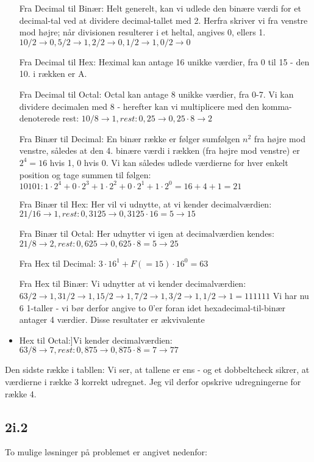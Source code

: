\begin{itemize}
\item[Fra Decimal til Binær:]{Helt generelt, kan vi udlede den binære værdi for et decimal-tal ved at dividere decimal-tallet med 2. Herfra skriver vi fra venstre mod højre; når divisionen resulterer i et heltal, angives 0, ellers 1. $10/2 \rightarrow 0, 5/2 \rightarrow 1, 2/2 \rightarrow 0, 1/2 \rightarrow 1, 0/2 \rightarrow 0$}
\item[Fra Decimal til Hex:]{Heximal kan antage 16 unikke værdier, fra 0 til 15 - den 10. i rækken er A.}
\item[Fra Decimal til Octal:]{Octal kan antage 8 unikke værdier, fra 0-7. Vi kan dividere decimalen med 8 - herefter kan vi multiplicere med den komma-denoterede rest: $10/8 \rightarrow 1, rest: 0,25 \rightarrow 0,25 \cdot 8 \rightarrow 2$}
\item[Fra Binær til Decimal:]{En binær række er følger sumfølgen  $n^2$ fra højre mod venstre, således at den 4. binære værdi i rækken (fra højre mod venstre) er $2^4 = 16$ hvis 1, 0 hvis 0. Vi kan således udlede værdierne for hver enkelt position og tage summen til følgen: $10101: 1 \cdot 2^4 + 0 \cdot 2^3 + 1 \cdot 2^2 + 0 \cdot 2^1 + 1 \cdot 2^0 = 16 + 4 + 1 = 21$}
\item[Fra Binær til Hex:]{Her vil vi udnytte, at vi kender decimalværdien: $21/16 \rightarrow 1, rest: 0,3125 \rightarrow 0,3125 \cdot 16 = 5 \rightarrow 15$}
\item[Fra Binær til Octal:]{Her udnytter vi igen at decimalværdien kendes: $21/8 \rightarrow 2, rest: 0,625 \rightarrow 0,625 \cdot 8 = 5 \rightarrow 25$}
\item[Fra Hex til Decimal:]{$3 \cdot 16^1 + F (= 15) \cdot 16^0 = 63$}
\item[Fra Hex til Binær:]{Vi udnytter at vi kender decimalværdien: $63/2 \rightarrow 1, 31/2 \rightarrow 1, 15/2 \rightarrow 1, 7/2 \rightarrow 1, 3/2 \rightarrow 1, 1/2 \rightarrow 1 = 111111$ Vi har nu 6 1-taller - vi bør derfor angive to 0'er foran idet hexadecimal-til-binær antager 4 værdier. Disse resultater er ækvivalente}
\item Hex til Octal:]{Vi kender decimalværdien: $63/8 \rightarrow 7, rest: 0,875 \rightarrow 0,875 \cdot 8 = 7 \rightarrow 77$}
\end{itemize}
Den sidste række i tabllen: Vi ser, at tallene er ens - og et dobbeltcheck sikrer, at værdierne i række 3 korrekt udregnet. Jeg vil derfor opskrive udregningerne for række 4. 

\subsection*{2i.2}

To mulige løsninger på problemet er angivet nedenfor:


